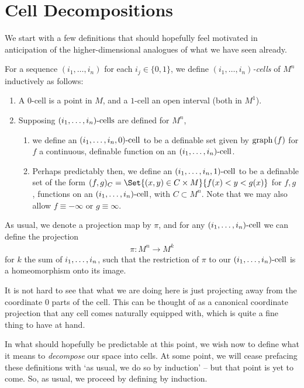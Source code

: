 


\section{Cell Decompositions}

We start with a few definitions that should hopefully feel motivated in anticipation of the higher-dimensional analogues of what we have seen already.

\begin{definition}[Cells in $M^n$]
  For a sequence $(i_1, \hdots, i_n)$ for each $i_j \in \{0, 1\}$, we define $(i_1, \hdots, i_n)$\emph{-cells} of $M^n$ inductively as follows:
  \begin{enumerate}
    \item A $0$-cell is a point in $M$, and a $1$-cell an open interval (both in $M^1$).
    \item Supposing $(i_1, \hdots, i_n)\textrm{-cells}$ are defined for $M^n$,
	\begin{enumerate}
	  \item we define an $(i_1, \hdots, i_n, 0)\textrm{-cell}$ to be a definable set given by $\operatorname{graph}\left(f\right)$ for $f$ a continuous, definable function on an $(i_1, \hdots, i_n)\textrm{-cell}$.
	  \item Perhaps predictably then, we define an $(i_1, \hdots, i_n, 1)\textrm{-cell}$ to be a definable set of the form $(f, g)_C = \Set{(x, y) \in C \times M}{f(x) < y < g(x)}$ for $f, g$ \cont,  functions on an $(i_1, \hdots, i_n)\textrm{-cell}$, with $C \subset M^n$. Note that we may also allow $f \equiv - \infty$ or $g \equiv \infty$.
	\end{enumerate}

  \end{enumerate}

  As usual, we denote a projection map by $\pi$, and for any $(i_1, \hdots, i_n)\textrm{-cell}$ we can define the projection
  \begin{align*}
    \pi \colon M^n \to M^k
  \end{align*}
  for $k$ the sum of $i_1, \hdots, i_n$, such that the restriction of $\pi$ to our $(i_1, \hdots, i_n)\textrm{-cell}$ is a homeomorphism onto its image.
\end{definition}

It is not hard to see that what we are doing here is just projecting away from the coordinate 0 parts of the cell. This can be thought of as a canonical coordinate projection that any cell comes naturally equipped with, which is quite a fine thing to have at hand.

In what should hopefully be predictable at this point, we wish now to define what it means to \emph{decompose} our space into cells. At some point, we will cease prefacing these definitions with `as usual, we do so by induction' -- but that point is yet to come. So, as usual, we proceed by defining \cds by induction.

